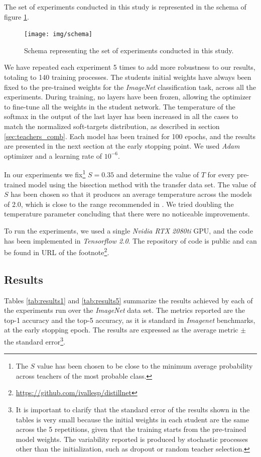 \documentclass{elsarticle}
\begin{document}
	The set of experiments conducted in this study is represented in the schema of figure \ref{fig:schema}.
	
\begin{figure}[h!]
	\centering
	\texttt{[image: img/schema]}
	\caption{Schema representing the set of experiments conducted in this study.}
	\label{fig:schema}
\end{figure}

		
	We have repeated each experiment 5 times to add more robustness to our results, totaling to 140 training processes. The students initial weights have always been fixed to the pre-trained weights for the \textit{ImageNet} classification task, across all the experiments. During training, no layers have been frozen, allowing the optimizer to fine-tune all the weights in the student network. The temperature of the softmax in the output of the last layer has been increased in all the cases to match the normalized soft-targets distribution, as described in section \ref{sec:teachers_comb}.  Each model has been trained for 100 epochs, and the results are presented in the next section at the early stopping point. We used \textit{Adam} optimizer \citep{Kingma14} and a learning rate of $10^{-6}$. 
	
	 In our experiments we fix\footnote{The $S$ value has been chosen to be close to the minimum average probability across teachers of the most probable class.} $S=0.35$ and determine the value of $T$ for every pre-trained model using the bisection method with the transfer data set. The value of $S$ has been chosen so that it produces an average temperature across the models of 2.0, which is close to the range recommended in \citep{hinton2015}. We tried doubling the temperature parameter concluding that there were no noticeable improvements.
	 
	 To run the experiments, we used a single \textit{Nvidia RTX 2080ti} GPU, and the code has been implemented in \textit{Tensorflow 2.0}. The repository of code is public and can be found in URL of the footnote\footnote{\url{https://github.com/ivallesp/distillnet}}.
		
	\subsection{Results}  \label{sec:results}
	Tables \ref{tab:results1} and \ref{tab:results5} summarize the results achieved by each of the experiments run over the \textit{ImageNet} data set. The metrics reported are the top-1 accuracy and the top-5 accuracy, as it is standard in \textit{Imagenet} benchmarks, at the early stopping epoch. The results are expressed as the average metric $\pm$ the standard error\footnote{It is important to clarify that the standard error of the results shown in the tables is very small because the initial weights in each student are the same across the 5 repetitions, given that the training starts from the pre-trained model weights. The variability reported is produced by stochastic processes other than the initialization, such as dropout or random teacher selection.}.  
	
\end{document}
